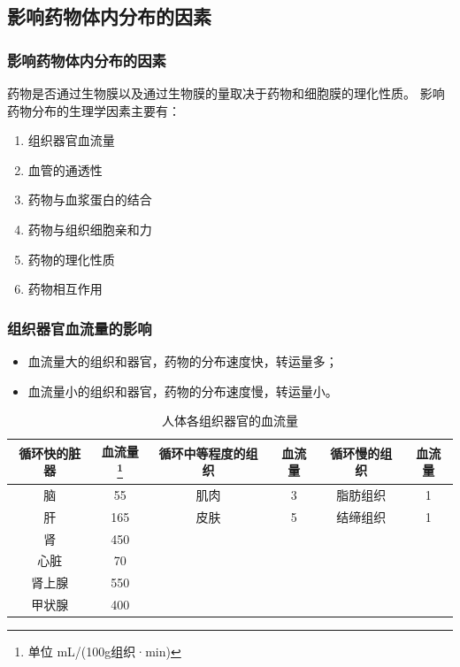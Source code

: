 \documentclass[dvipsnames, svgnames, x11names]{beamer}
\begin{document}
\subsection{影响药物体内分布的因素}


\begin{frame}
    \frametitle{影响药物体内分布的因素}
    药物是否通过生物膜以及通过生物膜的量取决于药物和细胞膜的理化性质。 影响药物分布的生理学因素主要有：
    \begin{enumerate}
      \item 组织器官血流量
      \item 血管的通透性
      \item 药物与血浆蛋白的结合
      \item 药物与组织细胞亲和力
      \item 药物的理化性质
      \item 药物相互作用
    \end{enumerate}
\end{frame}


\begin{frame}
    \frametitle{组织器官血流量的影响}
    \begin{itemize}
      \item 血流量大的组织和器官，药物的分布速度快，转运量多；
      \item 血流量小的组织和器官，药物的分布速度慢，转运量小。
    \end{itemize}

    \begin{table}
        \centering
        \caption{人体各组织器官的血流量}
        \vspace{-0.5em}
        \begin{tabular}{cc|cc|cc}
            \bottomrule
           循环快的脏器 & 血流量\footnote{单位 mL/(100g组织·min)} & 循环中等程度的组织 & 血流量 & 循环慢的组织 & 血流量 \\ \hline
           脑 & 55 & 肌肉 & 3 & 脂肪组织 & 1 \\ 
           肝 & 165 & 皮肤 & 5 & 结缔组织 & 1 \\ 
           肾 & 450 &  &  &  &  \\ 
           心脏 & 70 &  &  &  &  \\ 
           肾上腺 & 550 &  &  &  &  \\ 
           甲状腺 & 400 &  &  &  &  \\ \toprule
        \end{tabular}
    \end{table}
\end{frame}
\end{document}
